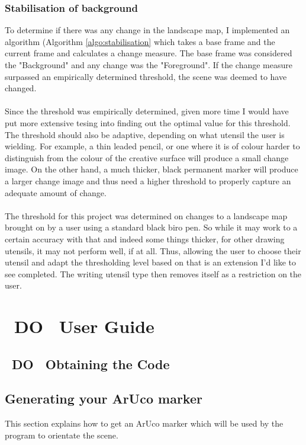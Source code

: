 \documentclass[11pt]{article}
\begin{document}
\subsubsection{Stabilisation of background}
To determine if there was any change in the landscape map, I implemented an
algorithm (Algorithm \ref{algo:stabilisation} which takes a base frame 
and the current frame and calculates a change measure. The base 
frame was considered the "Background" and any change was the
"Foreground". If the change measure surpassed an empirically determined 
threshold, the scene was deemed to have changed.\\
\\
Since the threshold was empirically determined, given more time I would
have put more extensive tesing into finding out the optimal value for 
this threshold. The threshold should also be adaptive, depending on what
utensil the user is wielding. For example, a thin leaded pencil, or one where
it is of colour harder to distinguish from the colour of the creative 
surface will produce a small change image. On the other hand, a 
much thicker, black permanent marker will produce a larger change image and
thus need a higher threshold to properly capture an adequate amount of 
change.\\
\\
The threshold for this project was determined on changes to a landscape
map brought on by a user using a standard black biro pen. So while it
may work to a certain accuracy with that and indeed some things thicker,
for other drawing utensils, it may not perform well, if at all. Thus,
allowing the user to choose their utensil and adapt the thresholding 
level based on that is an extension I'd like to see completed. The
writing utensil type then removes itself as a restriction on the user.

\newpage
\section{~DO~ User Guide}
\label{chapter:userguide}
\subsection{~DO~ Obtaining the Code}
\label{guide:obtainingcode}

\subsection{Generating your ArUco marker}
This section explains how to get an ArUco marker which will be used 
by the program to orientate the scene. 
\end{document}
